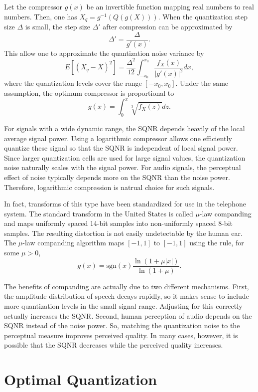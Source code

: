Let the compressor $g(x)$ be an invertible function mapping real numbers to real numbers.
Then, one has $X_q = g^{-1} \left( Q \left( g(X) \right) \right)$.
When the quantization step size $\Delta$ is small, the step size $\Delta'$ after compression can be approximated by
\[ \Delta' = \frac{\Delta}{g'(x)}. \]
This allow one to approximate the quantization noise variance by
\[ E \left[ (X_q - X)^2 \right] = \frac{\Delta^2}{12} \int_{-x_0}^{x_0} \frac{f_X (x)}{|g'(x)|^2} dx, \]
where the quantization levels cover the range $[-x_0,x_0]$.
Under the same assumption, the optimum compressor is proportional to
\[ g(x) = \int_{0}^{x} \sqrt[3]{f_X (z)} dz . \]

For signals with a wide dynamic range, the SQNR depends heavily of the local average signal power.
Using a logarithmic compressor allows one efficiently quantize these signal so that the SQNR is independent of local signal power.
Since larger quantization cells are used for large signal values, the quantization noise naturally scales with the signal power.
For audio signals, the perceptual effect of noise typically depends more on the SQNR than the noise power.
Therefore, logarithmic compression is natrual choice for such signals.

In fact, transforms of this type have been standardized for use in the telephone system.
The standard transform in the United States is called $\mu$-law companding and maps uniformly spaced 14-bit samples into non-uniformly spaced 8-bit samples.
The resulting distortion is not easily undetectable by the human ear.
The $\mu$-law companding algorithm maps $[-1,1]$ to $[-1,1]$ using the rule, for some $\mu >0$,
\[ g(x) = \mathrm{sgn}(x)\frac{\ln \left( 1+ \mu |x| \right)}{\ln (1+\mu)}. \]

The benefits of companding are actually due to two different mechanisms.
First, the amplitude distribution of speech decays rapidly, so it makes sense to include more quantization levels in the small signal range.
Adjusting for this correctly actually increases the SQNR.
Second, human perception of audio depends on the SQNR instead of the noise power.
So, matching the quantization noise to the perceptual measure improves perceived quality.
In many cases, however, it is possible that the SQNR decreases while the perceived quality increases.


\section{Optimal Quantization}

